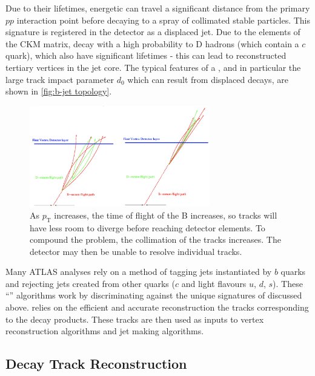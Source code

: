 Due to their lifetimes, energetic \bhadrons can travel a significant distance from the primary $pp$ interaction point before decaying to a spray of collimated stable particles. This signature is registered in the detector as a displaced jet. Due to the elements of the CKM matrix, \bhadrons decay with a high probability to D hadrons (which contain a $c$ quark), which also have significant lifetimes - this can lead to reconstructed tertiary vertices in the jet core. The typical features of a \bjet, and in particular the large track impact parameter $d_0$ which can result from displaced decays, are shown in \cref{fig:b-jet topology}.
%
\begin{figure}[!htbp]
    \centering
    \includegraphics[width=0.7\textwidth]{chapters/3.tracking/figs/high-pt-b-tracks.png}
    \caption{As \bhadron $p_\text{T}$ increases, the time of flight of the B increases, so tracks will have less room to diverge before reaching detector elements. To compound the problem, the collimation of the tracks increases. The detector may then be unable to resolve individual tracks.}
    \label{fig:bhadron tracking problems}
\end{figure}
%
Many ATLAS analyses rely on a method of tagging jets instantiated by $b$ quarks and rejecting jets created from other quarks ($c$ and light flavours $u$, $d$, $s$). These ``\btagging'' algorithms work by discriminating against the unique signatures of \bjets discussed above. \btagging relies on the efficient and accurate reconstruction the tracks corresponding to the \bhadron decay products. These tracks are then used as inputs to vertex reconstruction algorithms and jet making algorithms.


\subsection{\bhadron Decay Track Reconstruction}\label{sec:B track reco challenges}

